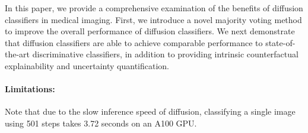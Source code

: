 In this paper, we provide a comprehensive examination of the benefits of diffusion classifiers in medical imaging. First, we introduce a novel majority voting method to improve the overall performance of diffusion classifiers. We next demonstrate that diffusion classifiers are able to achieve comparable performance to state-of-the-art discriminative classifiers, in addition to providing intrinsic counterfactual explainability and uncertainty quantification. %

\paragraph{Limitations:} Note that due to the slow inference speed of diffusion, classifying a single image using 501 steps takes 3.72 seconds on an A100 GPU. %